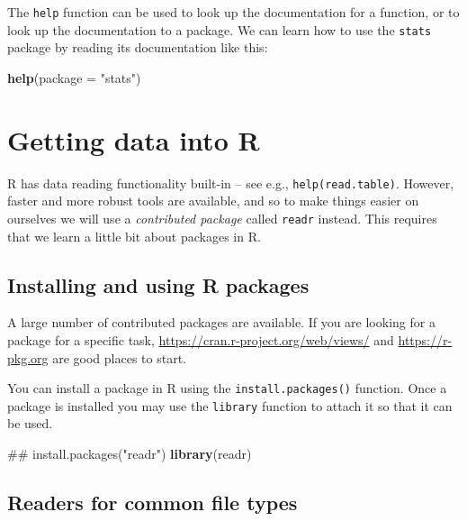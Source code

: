 \documentclass[]{book}
\newenvironment{Shaded}{\begin{snugshade}}{\end{snugshade}}
\newcommand{\KeywordTok}[1]{\textcolor[rgb]{0.13,0.29,0.53}{\textbf{#1}}}
\newcommand{\DataTypeTok}[1]{\textcolor[rgb]{0.13,0.29,0.53}{#1}}
\newcommand{\StringTok}[1]{\textcolor[rgb]{0.31,0.60,0.02}{#1}}
\newcommand{\NormalTok}[1]{#1}
\begin{document}
The \texttt{help} function can be used to look up the documentation for
a function, or to look up the documentation to a package. We can learn
how to use the \texttt{stats} package by reading its documentation like
this:

\begin{Shaded}
\begin{Highlighting}[]
\KeywordTok{help}\NormalTok{(}\DataTypeTok{package =} \StringTok{"stats"}\NormalTok{)}
\end{Highlighting}
\end{Shaded}

\section{Getting data into R}\label{getting-data-into-r}

R has data reading functionality built-in -- see e.g.,
\texttt{help(read.table)}. However, faster and more robust tools are
available, and so to make things easier on ourselves we will use a
\emph{contributed package} called \texttt{readr} instead. This requires
that we learn a little bit about packages in R.

\subsection{Installing and using R
packages}\label{installing-and-using-r-packages}

A large number of contributed packages are available. If you are looking
for a package for a specific task,
\url{https://cran.r-project.org/web/views/} and \url{https://r-pkg.org}
are good places to start.

You can install a package in R using the \texttt{install.packages()}
function. Once a package is installed you may use the \texttt{library}
function to attach it so that it can be used.

\begin{Shaded}
\begin{Highlighting}[]
\NormalTok{## install.packages("readr")}
\KeywordTok{library}\NormalTok{(readr)}
\end{Highlighting}
\end{Shaded}

\subsection{Readers for common file
types}\label{readers-for-common-file-types}
\end{document}
